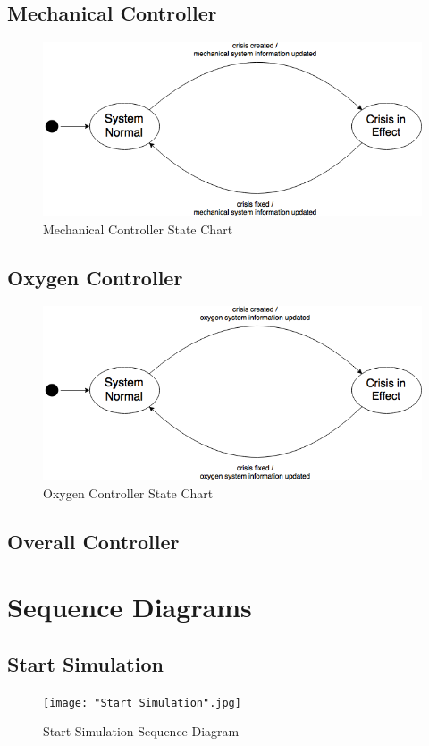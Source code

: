 \documentclass[12pt, titlepage]{article}
\begin{document}
\subsection{Mechanical Controller}
\begin{figure}[H]
\centering
\includegraphics[width=120mm]{MechanicalController.png}
\caption{Mechanical Controller State Chart}
\end{figure}

\subsection{Oxygen Controller}\begin{figure}[H]
\centering
\includegraphics[width=120mm]{OxygenController.png}
\caption{Oxygen Controller State Chart}
\end{figure}

\subsection{Overall Controller}

\section{Sequence Diagrams}
\label{sec:sequence_diagrams}
\subsection*{Start Simulation}
\begin{figure}[H]
\centering
\texttt{[image: "Start Simulation".jpg]}
\caption{Start Simulation Sequence Diagram}
\end{figure}
\end{document}
